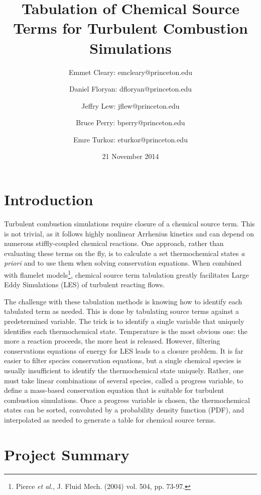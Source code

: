 \documentclass[11pt]{article}
\begin{document}
\title{\textbf{Tabulation of Chemical Source Terms for Turbulent
    Combustion Simulations}}

\author{Emmet Cleary: emcleary@princeton.edu \and Daniel Floryan:
  dfloryan@princeton.edu \and Jeffry Lew: jflew@princeton.edu \and
  Bruce Perry: bperry@princeton.edu \and Emre Turkoz:
  eturkoz@princeton.edu} 

\date{21 November 2014 }
\maketitle

\section{Introduction}

Turbulent combustion simulations require closure of a chemical source
term. This is not trivial, as it follows highly nonlinear Arrhenius
kinetics and can depend on numerous stiffly-coupled chemical
reactions. One approach, rather than evaluating these terms on the
fly, is to calculate a set thermochemical states \textit{a priori} and
to use them when solving conservation equations. When combined with
flamelet models\footnote{Pierce \textit{et al.}, J. Fluid Mech. (2004)
  vol. 504, pp. 73-97.}, chemical source term tabulation greatly
facilitates Large Eddy Simulations (LES) of turbulent reacting flows.

The challenge with these tabulation methods is knowing how to identify
each tabulated term as needed.  This is done by tabulating source
terms against a predetermined variable. The trick is to identify a
single variable that uniquely identifies each thermochemical
state. Temperature is the most obvious one: the more a reaction
proceeds, the more heat is released. However, filtering conservations
equations of energy for LES leads to a closure problem. It is far
easier to filter species conservation equations, but a single chemical
species is usually insufficient to identify the thermochemical state
uniquely. Rather, one must take linear combinations of several
species, called a progress variable, to define a mass-based
conservation equation that is suitable for turbulent combustion
simulations. Once a progress variable is chosen, the thermochemical
states can be sorted, convoluted by a probability density function
(PDF), and interpolated as needed to generate a table for chemical
source terms.

\section{Project Summary}
\end{document}
